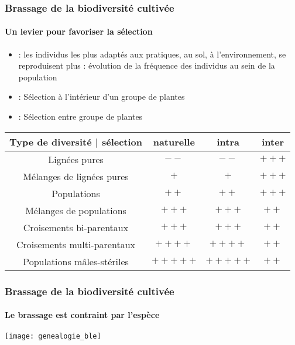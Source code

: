\begin{frame}
\frametitle{Brassage de la biodiversité cultivée}
\framesubtitle{Un levier pour favoriser la sélection}

\begin{itemize}
\item {}: les individus les plus adaptés aux pratiques, au sol, à l'environnement, se reproduisent plus : évolution de la fréquence des individus au sein de la population

\item {}: Sélection à l'intérieur d'un groupe de plantes

\item {}: Sélection entre groupe de plantes

\end{itemize}

\begin{center}
\begin{tabular}{cccc}
\hline
Type de diversité | sélection & naturelle & intra & inter \\
\hline
Lignées pures & $--$ & $--$ & $+++$ \\
\hline
Mélanges de lignées pures & $+$ & $+$ & $+++$ \\
\hline
Populations & $++$ & $++$ & $+++$ \\
\hline
Mélanges de populations & $+++$ & $+++$ & $++$ \\
\hline
Croisements bi-parentaux & $+++$ & $+++$ & $++$ \\
\hline
Croisements multi-parentaux & $++++$ & $++++$ & $++$ \\
\hline
Populations mâles-stériles & $+++++$ & $+++++$ & $++$ \\
\hline
\end{tabular}
\end{center}


\end{frame}


\begin{frame}
\frametitle{Brassage de la biodiversité cultivée}
\framesubtitle{Le brassage est contraint par l'espèce}

\begin{center}
\texttt{[image: genealogie\_ble]}
\end{center}


\end{frame}

